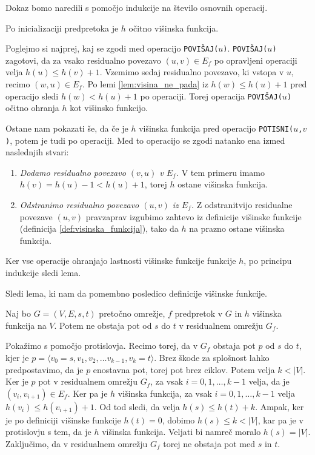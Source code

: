 \documentclass[mat1]{fmfdelo}
\begin{document}
\begin{dokaz}
Dokaz bomo naredili s pomočjo indukcije na število osnovnih operacij.

Po inicializaciji predpretoka je $h$ očitno višinska funkcija.

Poglejmo si najprej, kaj se zgodi med operacijo \texttt{POVIŠAJ($u$)}. \texttt{POVIŠAJ($u$)} zagotovi, da za vsako residualno povezavo $(u,v) \in E_f$ po opravljeni operaciji velja $h(u) \leq h(v) +1$. Vzemimo sedaj residualno povezavo, ki vstopa v $u$, recimo $(w,u) \in E_f$. Po lemi \ref{lem:visina_ne_pada} iz $h(w) \leq h(u) + 1$ pred operacijo sledi $h(w) < h(u) + 1$ po operaciji. Torej operacija \texttt{POVIŠAJ($u$)} očitno ohranja $h$ kot višinsko funkcijo.

Ostane nam pokazati še, da če je $h$ višinska funkcija pred operacijo \texttt{POTISNI($u$,$v$)}, potem je tudi po operaciji. Med to operacijo se zgodi natanko ena izmed naslednjih stvari:

\begin{enumerate}
\item \textit{Dodamo residualno povezavo $(v,u)$ v $E_f$.} V tem primeru imamo $h(v) = h(u) - 1 < h(u) + 1$, torej $h$ ostane višinska funkcija.
\item \textit{Odstranimo residualno povezavo $(u,v)$ iz $E_f$.} Z odstranitvijo residualne povezave $(u,v)$ pravzaprav izgubimo zahtevo iz definicije višinske funkcije (definicija \ref{def:visinska_funkcija}), tako da $h$ na prazno ostane višinska funkcija.
\end{enumerate}

Ker vse operacije ohranjajo lastnosti višinske funkcije funkcije $h$, po principu indukcije sledi lema.
\end{dokaz}

Sledi lema, ki nam da pomembno posledico definicije višinske funkcije.

\begin{lema}\label{lem:ni_poti}
Naj bo $G=(V,E,s,t)$ pretočno omrežje, $f$ predpretok v $G$ in $h$ višinska funkcija na $V$. Potem ne obstaja pot od $s$ do $t$ v residualnem omrežju $G_f$.
\end{lema}

\begin{dokaz}
Pokažimo s pomočjo protislovja. Recimo torej, da v $G_f$ obstaja pot $p$ od $s$ do $t$, kjer je $p = \langle v_0 = s, v_1, v_2, \dotsc v_{k-1}, v_k = t\rangle$. Brez škode za splošnost lahko predpostavimo, da je $p$ enostavna pot, torej pot brez ciklov. Potem velja $k < |V|$. Ker je $p$ pot v residualnem omrežju $G_f$, za vsak $i = 0, 1, \dotsc, k-1$ velja, da je $(v_i, v_{i+1}) \in E_f$. Ker pa je $h$ višinska funkcija, za vsak $i = 0, 1, \dotsc, k-1$ velja $h(v_i) \leq h(v_{i+1}) + 1$. Od tod sledi, da velja $h(s) \leq h(t) + k$. Ampak, ker je po definiciji višinske funkcije $h(t) = 0$, dobimo $h(s) \leq k < |V|$, kar pa je v protislovju s tem, da je $h$ višinska funkcija. Veljati bi namreč moralo $h(s) = |V|$. Zaključimo, da v residualnem omrežju $G_f$ torej ne obstaja pot med $s$ in $t$.
\end{dokaz}
\end{document}
